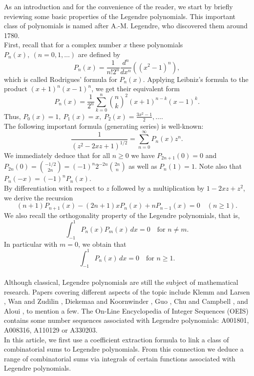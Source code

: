 \documentclass[11pt,reqno]{amsart}
\theoremstyle{plain}
\numberwithin{equation}{section}
\begin{document}
As an introduction and for the convenience of the reader, we start by briefly reviewing some basic properties of the Legendre polynomials.
This important class of polynomials is named after A.-M. Legendre, who discovered them around 1780. \\
First, recall that for a complex number $x$ these polynomials $P_n(x),\ (n=0,1,\ldots)$ are defined by
\[P_n(x) = \frac{1}{n! 2^n} \frac{d^n}{dx^n} \left((x^2-1)^n\right),\]
which is called Rodrigues’ formula for $P_n(x)$. Applying Leibniz's formula to the product $(x+1)^n (x-1)^n$, we get their equivalent form
\begin{equation}\label{intro_a} 
P_n(x) = \frac{1}{2^n} \sum_{k=0}^n \binom{n}{k}^2 (x+1)^{n-k} (x-1)^k.
\end{equation}
Thus, $P_0(x)=1,\ P_1(x)=x,\ P_2(x)=\frac{3x^2-1}{2},\ldots$.\\
The following important formula (generating series) is well-known:
\begin{equation}\label{intro_b}
\frac{1}{(z^2-2xz+1)^{1/2}} = \sum_{n=0}^{\infty} P_n(x) z^n.
\end{equation}
We immediately deduce that for all $n\ge 0$ we have $P_{2n+1}(0)=0$  and $P_{2n}(0)=\binom{-1/2}{2n}=(-1)^n 2^{-2n}\binom{2n}{n}$ as well as $P_n(1)=1$. Note also that $P_n(-x)=(-1)^n P_n(x)$. \\
By differentiation with respect to $z$ followed by a multiplication by $1-2xz+z^2$, we derive the recursion
\begin{equation}\label{intro_c}
(n+1)P_{n+1}(x) - (2n+1) x P_n(x) + nP_{n-1}(x) = 0 \quad (n\ge 1).
\end{equation}
We also recall the orthogonality property of the Legendre polynomials, that is, 
$$\int_{-1}^1 P_n(x)P_m(x)\,dx = 0\quad\text{for}\,\, n\neq m.$$ 
In particular with $m=0$, we obtain that 
$$\int_{-1}^1 P_n(x)\,dx = 0 \quad\text{for}\,\, n\ge 1.$$ \\
Although classical, Legendre polynomials are still the subject of mathematical research. Papers covering different aspects of the topic 
include Klemm and Larsen \cite{Klemm}, Wan and Zudilin \cite{Wan}, Diekemaa and Koornwinder \cite{Diekemaa}, Guo \cite{Guo}, 
Chu and Campbell \cite{Chu}, and Aloui \cite{Aloui}, to mention a few.
The On-Line Encyclopedia of Integer Sequences (OEIS) \cite{OEIS} contains some number sequences associated with Legendre polynomials:
A001801, A008316, A110129 or A330203. \\
In this article, we first use a coefficient extraction formula to link a class of combinatorial sums to Legendre polynomials.
From this connection we deduce a range of combinatorial sums via integrals of certain functions associated with Legendre polynomials.
\end{document}
